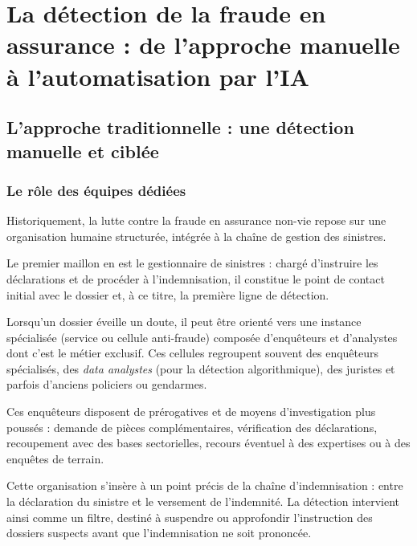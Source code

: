 \chapter{La détection de la fraude en assurance : de l'approche manuelle à l'automatisation par l'IA}
\label{chap:detection}

\section{L'approche traditionnelle : une détection manuelle et ciblée}

\subsection{Le rôle des équipes dédiées}

Historiquement, la lutte contre la fraude en assurance non-vie repose sur une organisation humaine structurée, intégrée à la chaîne de gestion des sinistres.

Le premier maillon en est le gestionnaire de sinistres : chargé d'instruire les déclarations et de procéder à l'indemnisation, il constitue le point de contact initial avec le dossier et, à ce titre, la première ligne de détection.

Lorsqu'un dossier éveille un doute, il peut être orienté vers une instance spécialisée (service ou cellule anti-fraude) composée d'enquêteurs et d'analystes dont c'est le métier exclusif. Ces cellules regroupent souvent des enquêteurs spécialisés, des \textit{data analystes} (pour la détection algorithmique), des juristes et parfois d'anciens policiers ou gendarmes.

Ces enquêteurs disposent de prérogatives et de moyens d'investigation plus poussés : demande de pièces complémentaires, vérification des déclarations, recoupement avec des bases sectorielles, recours éventuel à des expertises ou à des enquêtes de terrain.

Cette organisation s'insère à un point précis de la chaîne d'indemnisation : entre la déclaration du sinistre et le versement de l'indemnité. La détection intervient ainsi comme un filtre, destiné à suspendre ou approfondir l'instruction des dossiers suspects avant que l'indemnisation ne soit prononcée.

